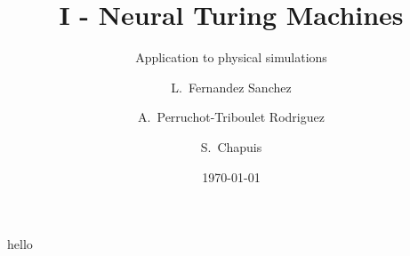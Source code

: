 \documentclass{beamer}
\title{I - Neural Turing Machines}
\subtitle{Application to physical simulations}
\author[Lucia Fernandez Sanchez, Alexandra Perruchot-Triboulet Rodriguez, Samuel Chapuis]{L.~Fernandez Sanchez \and A.~Perruchot-Triboulet Rodriguez \and S.~Chapuis}
\date{\today}
\begin{document}
\frame{\titlepage}
\begin{frame}
  hello
\end{frame}














    

   
        

    


    
\end{document}
